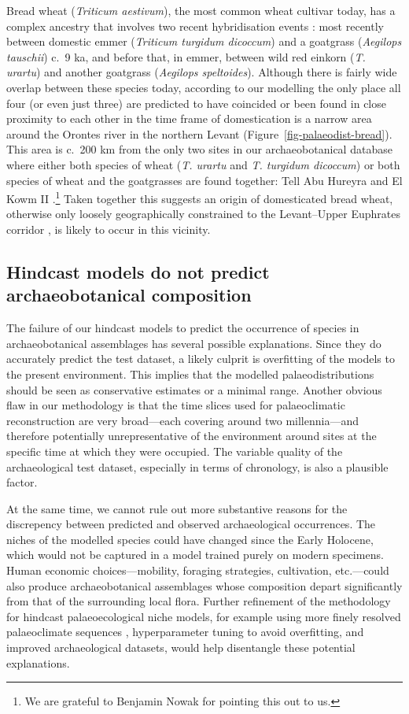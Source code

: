 \documentclass[
  authoryear,
  preprint]{elsarticle}
\begin{document}
Bread wheat (\emph{Triticum aestivum}), the most common wheat cultivar
today, has a complex ancestry that involves two recent hybridisation
events \citep{LevyFeldman2022}: most recently between domestic emmer
(\emph{Triticum turgidum dicoccum}) and a goatgrass (\emph{Aegilops
tauschii}) c.~9 ka, and before that, in emmer, between wild red einkorn
(\emph{T. urartu}) and another goatgrass (\emph{Aegilops speltoides}).
Although there is fairly wide overlap between these species today,
according to our modelling the only place all four (or even just three)
are predicted to have coincided or been found in close proximity to each
other in the time frame of domestication is a narrow area around the
Orontes river in the northern Levant
(Figure~\ref{fig-palaeodist-bread}). This area is c.~200 km from the
only two sites in our archaeobotanical database where either both
species of wheat (\emph{T. urartu} and \emph{T. turgidum dicoccum}) or
both species of wheat and the goatgrasses are found together: Tell Abu
Hureyra and El Kowm II \citep{ArranzOtaeguiRoe2023}.\footnote{We are
  grateful to Benjamin Nowak for pointing this out to us.} Taken
together this suggests an origin of domesticated bread wheat, otherwise
only loosely geographically constrained to the Levant--Upper Euphrates
corridor \citep{LevyFeldman2022}, is likely to occur in this vicinity.

\subsection{Hindcast models do not predict archaeobotanical
composition}\label{sec-discuss-hindcasting}

The failure of our hindcast models to predict the occurrence of species
in archaeobotanical assemblages has several possible explanations. Since
they do accurately predict the test dataset, a likely culprit is
overfitting of the models to the present environment. This implies that
the modelled palaeodistributions should be seen as conservative
estimates or a minimal range. Another obvious flaw in our methodology is
that the time slices used for palaeoclimatic reconstruction are very
broad---each covering around two millennia---and therefore potentially
unrepresentative of the environment around sites at the specific time at
which they were occupied. The variable quality of the archaeological
test dataset, especially in terms of chronology, is also a plausible
factor.

At the same time, we cannot rule out more substantive reasons for the
discrepency between predicted and observed archaeological occurrences.
The niches of the modelled species could have changed since the Early
Holocene, which would not be captured in a model trained purely on
modern specimens. Human economic choices---mobility, foraging
strategies, cultivation, etc.---could also produce archaeobotanical
assemblages whose composition depart significantly from that of the
surrounding local flora. Further refinement of the methodology for
hindcast palaeoecological niche models, for example using more finely
resolved palaeoclimate sequences \citep[e.g.][]{KargerEtAl2023},
hyperparameter tuning to avoid overfitting, and improved archaeological
datasets, would help disentangle these potential explanations.
\end{document}
